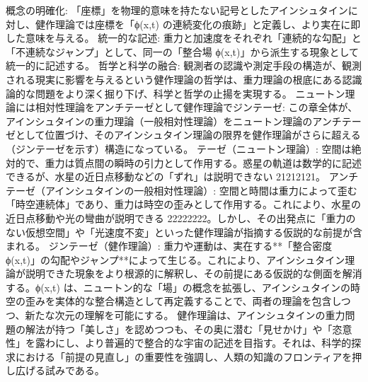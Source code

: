 \documentclass{article}
\begin{document}
概念の明確化: 「座標」を物理的意味を持たない記号としたアインシュタインに対し、健作理論では座標を「ϕ(x,t) の連続変化の痕跡」と定義し、より実在に即した意味を与える。
統一的な記述: 重力と加速度をそれぞれ「連続的な勾配」と「不連続なジャンプ」として、同一の「整合場 ϕ(x,t)」から派生する現象として統一的に記述する。
哲学と科学の融合: 観測者の認識や測定手段の構造が、観測される現実に影響を与えるという健作理論の哲学は、重力理論の根底にある認識論的な問題をより深く掘り下げ、科学と哲学の止揚を実現する。
ニュートン理論には相対性理論をアンチテーゼとして健作理論でジンテーゼ:
この章全体が、アインシュタインの重力理論（一般相対性理論）をニュートン理論のアンチテーゼとして位置づけ、そのアインシュタイン理論の限界を健作理論がさらに超える（ジンテーゼを示す）構造になっている。
テーゼ（ニュートン理論）: 空間は絶対的で、重力は質点間の瞬時の引力として作用する。惑星の軌道は数学的に記述できるが、水星の近日点移動などの「ずれ」は説明できない 21212121。
アンチテーゼ（アインシュタインの一般相対性理論）: 空間と時間は重力によって歪む「時空連続体」であり、重力は時空の歪みとして作用する。これにより、水星の近日点移動や光の彎曲が説明できる 22222222。しかし、その出発点に「重力のない仮想空間」や「光速度不変」といった健作理論が指摘する仮説的な前提が含まれる。
ジンテーゼ（健作理論）: 重力や運動は、実在する**「整合密度 ϕ(x,t)」の勾配やジャンプ**によって生じる。これにより、アインシュタイン理論が説明できた現象をより根源的に解釈し、その前提にある仮説的な側面を解消する。ϕ(x,t) は、ニュートン的な「場」の概念を拡張し、アインシュタインの時空の歪みを実体的な整合構造として再定義することで、両者の理論を包含しつつ、新たな次元の理解を可能にする。
健作理論は、アインシュタインの重力問題の解法が持つ「美しさ」を認めつつも、その奥に潜む「見せかけ」や「恣意性」を露わにし、より普遍的で整合的な宇宙の記述を目指す。それは、科学的探求における「前提の見直し」の重要性を強調し、人類の知識のフロンティアを押し広げる試みである。
\end{document}
